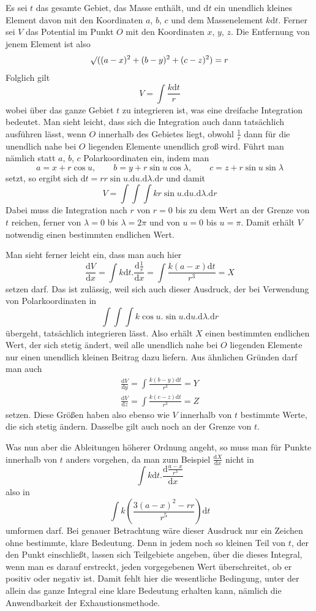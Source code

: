 Es sei $t$ das gesamte Gebiet, das Masse enthält, und $\mathrm{d}t$ ein unendlich kleines Element davon mit den Koordinaten $a$, $b$, $c$ und dem Massenelement $k\mathrm{d}t$. Ferner sei $V$ das Potential im Punkt $O$ mit den Koordinaten $x$, $y$, $z$. Die Entfernung von jenem Element ist also
\[
\mathord{{}^{}\!\surd}((a-x)^2+(b-y)^2+(c-z)^2)=r
\]
Folglich gilt
\[
V=\int\frac{k\mathrm{d}t}{r}
\]
wobei über das ganze Gebiet $t$ zu integrieren ist, was eine dreifache Integration bedeutet. Man sieht leicht, dass sich die Integration auch dann tatsächlich ausführen lässt, wenn $O$ innerhalb des Gebietes liegt, obwohl $\frac{1}{r}$ dann für die unendlich nahe bei $O$ liegenden Elemente unendlich groß wird. Führt man nämlich statt $a$, $b$, $c$ Polarkoordinaten ein, indem man
\[
a=x+r\cos u,\qquad b=y+r\sin u\cos\lambda,\qquad c=z+r\sin u\sin\lambda
\]
setzt, so ergibt sich $\mathrm{d}t=rr\sin u.\mathrm{d}u.\mathrm{d}\lambda.\mathrm{d}r$ und damit
\[
V=\int\!\int\!\int kr\sin u.\mathrm{d}u.\mathrm{d}\lambda.\mathrm{d}r
\]
Dabei muss die Integration nach $r$ von $r=0$ bis zu dem Wert an der Grenze von $t$ reichen, ferner von $\lambda=0$ bis $\lambda=2\pi$ und von $u=0$ bis $u=\pi$. Damit erhält $V$ notwendig einen bestimmten endlichen Wert.

Man sieht ferner leicht ein, dass man auch hier
\[
\frac{\mathrm{d}V}{\mathrm{d}x}=\int k\mathrm{d}t.\frac{\mathrm{d}\frac{1}{r}}{\mathrm{d}x}=\int\frac{k(a-x)\mathrm{d}t}{r^3}=X
\]
setzen darf. Das ist zulässig, weil sich auch dieser Ausdruck, der bei Verwendung von Polarkoordinaten in
\[
\int\!\int\!\int k\cos u.\sin u.\mathrm{d}u.\mathrm{d}\lambda.\mathrm{d}r
\]
übergeht, tatsächlich integrieren lässt. Also erhält $X$ einen bestimmten endlichen Wert, der sich stetig ändert, weil alle unendlich nahe bei $O$ liegenden Elemente nur einen unendlich kleinen Beitrag dazu liefern. Aus ähnlichen Gründen darf man auch
\[
\begin{array}{l}
\displaystyle\frac{\mathrm{d}V}{\mathrm{d}y}=\int\frac{k(b-y)\mathrm{d}t}{r^3}=Y\\[6pt]
\displaystyle\frac{\mathrm{d}V}{\mathrm{d}z}=\int\frac{k(c-z)\mathrm{d}t}{r^3}=Z
\end{array}
\]
setzen. Diese Größen haben also ebenso wie $V$ innerhalb von $t$ bestimmte Werte, die sich stetig ändern. Dasselbe gilt auch noch an der Grenze von $t$.

Was nun aber die Ableitungen höherer Ordnung angeht, so muss man für Punkte innerhalb von $t$ anders vorgehen, da man zum Beispiel $\frac{\mathrm{d}X}{\mathrm{d}x}$ nicht in
\[
\int k\mathrm{d}t.\frac{\mathrm{d}\frac{a-x}{r^3}}{\mathrm{d}x}
\]
also in
\[
\int k(\frac{3(a-x)^2-rr}{r^5})\mathrm{d}t
\]
umformen darf. Bei genauer Betrachtung wäre dieser Ausdruck nur ein Zeichen ohne bestimmte, klare Bedeutung. Denn in jedem noch so kleinen Teil von $t$, der den Punkt einschließt, lassen sich Teilgebiete angeben, über die dieses Integral, wenn man es darauf erstreckt, jeden vorgegebenen Wert überschreitet, ob er positiv oder negativ ist. Damit fehlt hier die wesentliche
Bedingung, unter der allein das ganze Integral eine klare Bedeutung erhalten kann, nämlich die Anwendbarkeit der Exhaustionsmethode.

